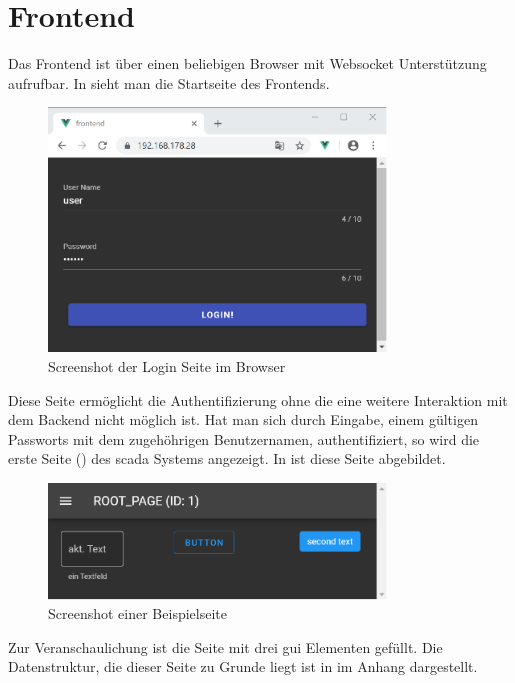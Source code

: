 \section{Frontend}\label{sec:poc:frontend}
Das Frontend ist über einen beliebigen Browser mit Websocket Unterstützung aufrufbar.
In  sieht man die Startseite des Frontends.
\begin{figure}[H]
  \centering
  \includegraphics[width=0.8\textwidth]{content/hauptteil/umsetzungPoC/frontend/res/login.pdf}
  \caption{Screenshot der Login Seite im Browser}
  \label{fig:frontend:poc:login}
\end{figure}
Diese Seite ermöglicht die Authentifizierung ohne die eine weitere Interaktion mit dem Backend nicht möglich ist.
Hat man sich durch Eingabe, einem gültigen Passworts mit dem zugehöhrigen Benutzernamen, authentifiziert, 
so wird die erste Seite () des \ac{scada} Systems angezeigt. In  ist diese Seite abgebildet.
\begin{figure}[ht]
  \centering
  \includegraphics[width=0.8\textwidth]{content/hauptteil/umsetzungPoC/frontend/res/page.pdf}
  \caption{Screenshot einer Beispielseite}
  \label{fig:frontend:poc:page}
\end{figure}
Zur Veranschaulichung ist die Seite mit drei \ac{gui} Elementen gefüllt. 
Die Datenstruktur, die dieser Seite zu Grunde liegt ist in  im Anhang dargestellt.
